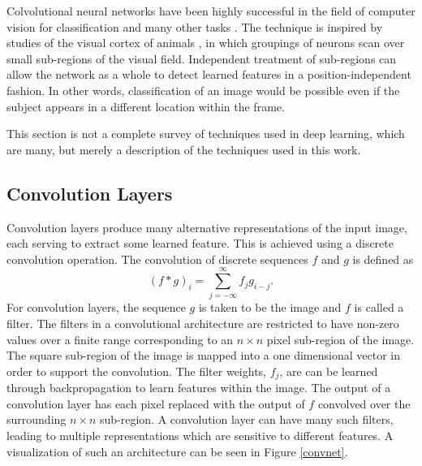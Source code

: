 Colvolutional neural networks have been highly successful in the field of
computer vision for classification and many other tasks
\cite{lecun2010convolutional,krizhevsky2012imagenet}.
The technique is inspired by studies of the visual cortex of animals
\cite{lecun2015deep}, in which groupings of neurons scan over small sub-regions
of the visual field.
Independent treatment of sub-regions can allow the network as a whole to detect
learned features in a position-independent fashion.
In other words, classification of an image would be possible even if the
subject appears in a different location within the frame.


This section is not a complete survey of techniques used in deep learning, which are many, but merely a description of the techniques used in this work.

\subsection{Convolution Layers}

Convolution layers \cite{lecun2015deep} produce many alternative representations
of the input image, each serving to extract some learned feature.
This is achieved using a  discrete convolution operation.  The convolution of discrete sequences $f$ and $g$ is defined as
\begin{equation}
(f*g)_i = \sum_{j = -\infty}^{\infty} f_j g_{i-j}.
\end{equation}
For convolution layers, the sequence $g$ is taken to be the image and $f$ is
called a filter.
The filters in a convolutional architecture are restricted to have non-zero values over a finite range corresponding to an $n \times n$ pixel sub-region of the image.
The square sub-region of the image is mapped into a one dimensional vector in order to support the convolution.  The filter weights, $f_j$, are can be learned through backpropagation to learn features within the image.  The output of a convolution layer has each pixel replaced with the output of $f$ convolved over the surrounding $n\times n$ sub-region.  A convolution layer can have many such filters, leading to multiple representations which are sensitive to different features.  A visualization of such an architecture can be seen in Figure \ref{convnet}.

